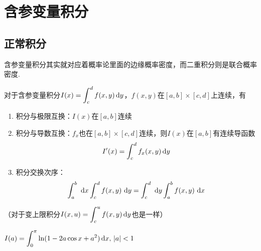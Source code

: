 
\section{含参变量积分}
\subsection{正常积分}
含参变量积分其实就对应着概率论里面的边缘概率密度，而二重积分则是联合概率密度.
\begin{theorem}
对于含参变量积分$I(x)=\displaystyle\int_c^df(x,y)\,\mathrm{d} y$，$f(x,y)$在$[a,b]\times [c,d]$上连续，有
\begin{enumerate}
	\item 积分与极限互换：$I(x)$在$[a,b]$连续
	\item 积分与导数互换：$f_x$也在$[a,b]\times [c,d]$连续，则$I(x)$在$[a,b]$有连续导函数
	\[I'(x)=\int_c^df_x(x,y)\,\mathrm{d} y\]
	\item 积分交换次序：
	\[\displaystyle\int_{a}^{b}{}\,\,\mathrm{d} x\displaystyle\int_{c}^{d}{f(x,y)}\,\,\mathrm{d} y=\displaystyle\int_{c}^{d}{}\,\,\mathrm{d} y\displaystyle\int_{a}^{b}{f(x,y)}\,\,\mathrm{d} x\]
\end{enumerate}
（对于变上限积分$I(x,u)=\displaystyle\int_c^uf(x,y)\,\mathrm{d} y$也是一样）
\end{theorem}
\begin{example}
$\displaystyle I(a)=\int_0^\pi\ln(1-2a\cos x+a^2)\,\mathrm{d} x,\,|a|<1$
\end{example}
